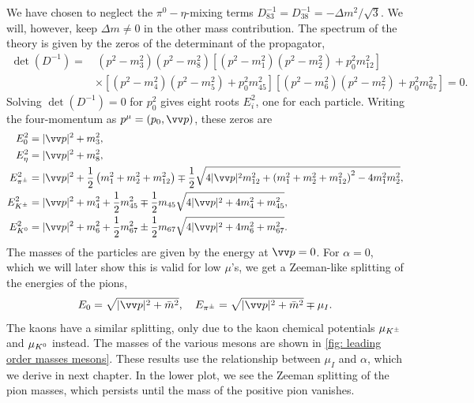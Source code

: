 %
We have chosen to neglect the $\pi^0 - \eta$-mixing terms $D_{83}^{-1} = D_{38}^{-1} = - \Delta m^2 / \sqrt{3}$.
We will, however, keep $\Delta m \neq 0$ in the other mass contribution.
The spectrum of the theory is given by the zeros of the determinant of the propagator,
\begin{align}
    \nonumber
    \det\left(D^{-1}\right)
    =&\,
    (p^2 - m_3^2)(p^2 - m_8^2)
    \left[ (p^2 - m_1^2)(p^2 - m_2^2) + p_0^2m_{12}^2  \right]\\
    &\times
    \left[ (p^2 - m_4^2)(p^2 - m_5^2) + p_0^2m_{45}^2  \right]\left[ (p^2 - m_6^2)(p^2 - m_7^2) + p_0^2m_{67}^2  \right]
    = 0.
\end{align}
%
Solving $\det(D^{-1}) = 0$ for $p_0^2$ gives eight roots $E_i^2$, one for each particle.
Writing the four-momentum as $p^\mu = (p_0, \vv p)$, these zeros are
%
\begingroup
\allowdisplaybreaks
\begin{align}
    \label{E1}
    E_0^2 &= |\vv p |^2 + m_3^2, \\
    \label{E2}
    E_\eta^2 &= |\vv p |^2 + m_8^2, \\
    E_\pipm^2
    & = |\vv p|^2 +
    \frac{1}{2}
    \left(
        m_1^2 + m_2^2 + m_{12}^2 
    \right)
    \mp
    \frac{1}{2}
    \sqrt{
        4|\vv p|^2m_{12}^2 
        +
        \left(
            m_1^2 + m_2^2 + m_{12}^2
        \right)^2
        - 4 m_1^2 m_2^2
    }, \\
    \label{E3}
    E_\Kpm^2
    & = |\vv p|^2 + m_4^2 + \frac{1}{2} m_{45}^2 
    \mp
    \frac{1}{2} m_{45} \sqrt{4|\vv p|^2 + 4 m_4^2 + m_{45}^2},\\
    \label{E4}
    E_\Ko^2
    &= |\vv p|^2 + m_6^2 + \frac{1}{2} m_{67}^2 
    \pm
    \frac{1}{2} m_{67} \sqrt{4|\vv p|^2 + 4 m_6^2 + m_{67}^2}.
\end{align}
\endgroup
%
The masses of the particles are given by the energy at $\vv p = 0$.
For $\alpha = 0$, which we will later show this is valid for low $\mu$'s, we get a Zeeman-like splitting of the energies of the pions,
%
\begin{equation}
    E_0 =\sqrt{|\vv p|^2 + \bar m^2}, \quad
    E_\pipm = \sqrt{|\vv p|^2 + \bar m^2} \mp \mu_I.
\end{equation}
%
The kaons have a similar splitting, only due to the kaon chemical potentials $\mu_{K^\pm}$ and $\mu_{K^0}$ instead.
The masses of the various mesons are shown in \autoref{fig: leading order masses mesons}.
These results use the relationship between $\mu_I$ and $\alpha$, which we derive in next chapter.
In the lower plot, we see the Zeeman splitting of the pion masses, which persists until the mass of the positive pion vanishes.
